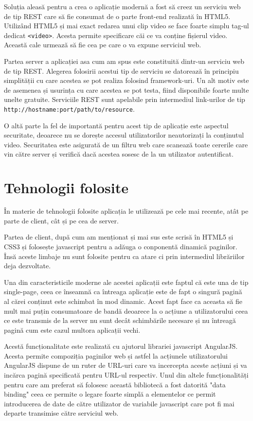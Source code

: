 \documentclass[12pt, a4paper, oneside, romanian]{teza-upb}
\begin{document}
Soluția aleasă pentru a crea o aplicație modernă a fost să creez un serviciu web de tip REST care să fie consumat de o parte front-end realizată în HTML5. Utilizând HTML5 și mai exact redarea unui clip video se face foarte simplu tag-ul dedicat \texttt{<video>}. Acesta permite specificare căi ce va conține fișierul video. Această cale urmează să fie cea pe care o va expune serviciul web.

Partea server a aplicației asa cum am spus este constituită dintr-un serviciu web de tip REST. Alegerea folosirii acestui tip de serviciu se datorează în principiu simplității cu care acestea se pot realiza folosind framework-uri. Un alt motiv este de asemenea și usurința cu care acestea se pot testa, fiind disponibile foarte multe unelte gratuite. Serviciile REST sunt apelabile prin intermediul link-urilor de tip \texttt{http://hostname:port/path/to/resource}.

O altă parte la fel de importantă pentru acest tip de aplicație este aspectul securitate, deoarece nu se dorește accesul utilizatorilor neautorizați la conținutul video. Securitatea este asigurată de un filtru web care scanează toate cererile care vin către server și verifică dacă acestea sosesc de la un utilizator autentificat.

\newpage
\chapter{Tehnologii folosite}
În materie de tehnologii folosite aplicația le utilizează pe cele mai recente, atât pe parte de client, cât și pe cea de server.

Partea de client, după cum am menționat și mai sus este scrisă în HTML5 și CSS3 și folosește javascript pentru a adăuga o conponentă dinamică paginilor. Însă aceste limbaje nu sunt folosite pentru ca atare ci prin intermediul librăriilor deja dezvoltate. 

Una din caracteristicile moderne ale acestei aplicații este faptul că este una de tip single-page, ceea ce înseamnă ca întreaga aplicație este de fapt o singură pagină al cărei conținut este schimbat în mod dinamic. Acest fapt face ca aceasta să fie mult mai puțin consumatoare de bandă deoarece la o acțiune a utilizatorului ceea ce este transmis de la server nu sunt decât schimbările necesare și nu întreagă pagină cum este cazul multora aplicații vechi.

Acestă funcționalitate este realizată cu ajutorul librariei javascript AngularJS. Acesta permite compoziția paginilor web și astfel la acțiunele utilizatorului AngularJS dispune de un ruter de URL-uri care va incercepta aceste acțiuni și va incărca pagină specificată pentru URL-ul respectiv. Unul din altele funcționalități pentru care am preferat să folosesc această bibliotecă a fost datorită "data binding" ceea ce permite o legare foarte simplă a elementelor ce permit introducerea de date de către utilizator de variabile javascript care pot fi mai departe transimise către serviciul web.
\end{document}
